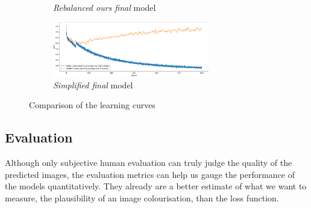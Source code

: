 \documentclass{article}
\begin{document}
\begin{figure}
\begin{subfigure}[b]{\textwidth}
        \caption{\textit{Rebalanced ours final} model}
    \end{subfigure}
    \begin{subfigure}[b]{\textwidth}
        \centering
        \includegraphics[width=0.75\textwidth]{GRAPHS/simplified_final.png}
        \caption{\textit{Simplified final} model}
    \end{subfigure}
    \caption{Comparison of the learning curves}
    \label{fig:learning_curves}
\end{figure}

\subsection{Evaluation}
Although only subjective human evaluation can truly judge the quality of the predicted images,
the evaluation metrics can help us gauge the performance of the models quantitatively.
They already are a better estimate of what we want to measure, the plausibility of an image colourisation,
than the loss function.
\end{document}
